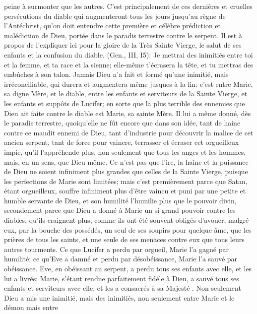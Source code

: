 peine à surmonter que les autres.
 C'est principalement de ces dernières et cruelles persécutions du diable qui augmenteront tous les jours
jusqu'au règne de l'Antéchrist, qu'on doit entendre cette première et célèbre prédiction et malédiction de Dieu,
portée dans le paradis terrestre contre le serpent. Il est à propos de l'expliquer ici pour la gloire de la Très Sainte
Vierge, le salut de ses enfants et la confusion du diable.
 (Gen., III, I5): Je mettrai des inimitiés entre toi et la femme, et ta race et la sienne; elle-même
t'écrasera la tête, et tu mettras des embûches à son talon.
 Jamais Dieu n'a fait et formé qu'une inimitié, mais irréconciliable, qui durera et augmentera même jusques à la
fin: c'est entre Marie, sa digne Mère, et le diable, entre les enfants et serviteurs de la Sainte Vierge, et les enfants
et suppôts de Lucifer; en sorte que la plus terrible des ennemies que Dieu ait faite contre le diable est Marie, sa
sainte Mère. Il lui a même donné, dès le paradis terrestre, quoiqu'elle ne fût encore que dans son idée, tant de
haine contre ce maudit ennemi de Dieu, tant d'industrie pour découvrir la malice de cet ancien serpent, tant de
force pour vaincre, terrasser et écraser cet orgueilleux impie, qu'il l'appréhende plus, non seulement que tous les
anges et les hommes, mais, en un sens, que Dieu même. Ce n'est pas que l'ire, la haine et la puissance de Dieu
ne soient infiniment plus grandes que celles de la Sainte Vierge, puisque les perfections de Marie sont limitées;
mais c'est premièrement parce que Satan, étant orgueilleux, souffre infiniment plus d'être vaincu et puni par une
petite et humble servante de Dieu, et son humilité l'humilie plus que le pouvoir divin, secondement parce que Dieu
a donné à Marie un si grand pouvoir contre les diables, qu'ils craignent plus, comme ils ont été souvent obligés
d'avouer, malgré eux, par la bouche des possédés, un seul de ses soupirs pour quelque âme, que les prières de
tous les saints, et une seule de ses menaces contre eux que tous leurs autres tourments.
 Ce que Lucifer a perdu par orgueil, Marie l'a gagné par humilité; ce qu'Eve a damné et perdu par
désobéissance, Marie l'a sauvé par obéissance. Eve, en obéissant au serpent, a perdu tous ses enfants avec elle,
et les lui a livrés; Marie, s'étant rendue parfaitement fidèle à Dieu, a sauvé tous ses enfants et serviteurs avec elle,
et les a consacrés à sa Majesté .
 Non seulement Dieu a mis une inimitié, mais des inimitiés, non seulement entre Marie et le démon mais entre
